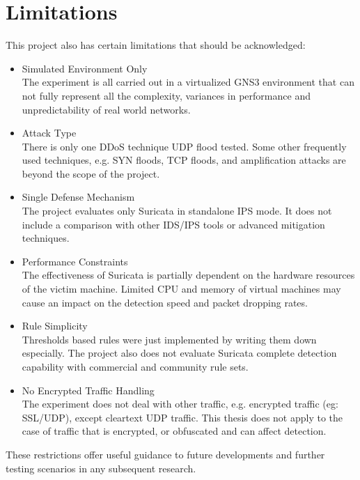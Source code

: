 \section{Limitations}
This project also has certain limitations that should be acknowledged:
\begin{itemize}
    \item Simulated Environment Only
    \\The experiment is all carried out in a virtualized GNS3 environment that can not fully represent all the complexity, variances in performance and unpredictability of real world networks.
    \item Attack Type
    \\ There is only one DDoS technique UDP flood tested. Some other frequently used techniques, e.g. SYN floods, TCP floods, and amplification attacks \cite{management2020research} are beyond the scope of the project.
    \item Single Defense Mechanism
    \\ The project evaluates only Suricata in standalone IPS mode. It does not include a comparison with other IDS/IPS tools or advanced mitigation techniques.
    \item Performance Constraints
    \\ The effectiveness of Suricata is partially dependent on the hardware resources of the victim machine. Limited CPU and memory of virtual machines may cause an impact on the detection speed and packet dropping rates.
    \item Rule Simplicity
    \\Thresholds based rules were just implemented by writing them down especially. The project also does not evaluate Suricata complete detection capability with commercial and community rule sets.
    \item No Encrypted Traffic Handling
    \\ The experiment does not deal with other traffic, e.g. encrypted traffic (eg: SSL/UDP), except cleartext UDP traffic. This thesis does not apply to the case of traffic that is encrypted, or obfuscated and can affect detection.
\end{itemize}
These restrictions offer useful guidance to future developments and further testing scenarios in any subsequent research.